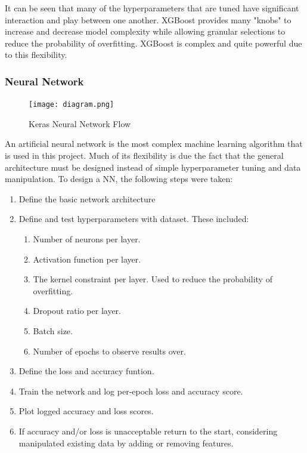 \documentclass[11pt]{article}
\begin{document}
	It can be seen that many of the hyperparameters that are tuned have significant interaction and play between one another. XGBoost provides many "knobs" to increase and decrease model complexity while allowing granular selections to reduce the probability of overfitting. XGBoost is complex and quite powerful due to this flexibility.
	
	\subsubsection{Neural Network}
	
	\begin{figure}
		\begin{center}
			\texttt{[image: diagram.png]}
		\end{center}
		\caption{Keras Neural Network Flow}
	\end{figure}

	An artificial neural network is the most complex machine learning algorithm that is used in this project. Much of its flexibility is due the fact that the general architecture must be designed instead of simple hyperparameter tuning and data manipulation. To design a NN, the following steps were taken:
	
	\begin{enumerate}
		\item Define the basic network architecture
		\item Define and test hyperparameters with dataset. These included:
			\begin{enumerate}
				\item Number of neurons per layer.
				\item Activation function per layer.
				\item The kernel constraint per layer. Used to reduce the probability of overfitting.
				\item Dropout ratio per layer. 
				\item Batch size.
				\item Number of epochs to observe results over.
			\end{enumerate}
		\item Define the loss and accuracy funtion.
		\item Train the network and log per-epoch loss and accuracy score.
		\item Plot logged accuracy and loss scores.
		\item If accuracy and/or loss is unacceptable return to the start, considering manipulated existing data by adding or removing features.
	\end{enumerate}
		
\end{document}
